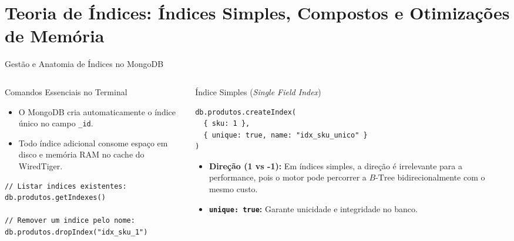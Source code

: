 \section[Índices Simples, Compostos e Otimizações]{Teoria de Índices: Índices Simples, Compostos e Otimizações de Memória}

\begin{frame}[fragile]{Gestão e Anatomia de Índices no MongoDB}
  \vspace{0.05cm}
  \begin{columns}[t]
    \begin{column}{0.48\textwidth}
      \alert{Comandos Essenciais no Terminal}\par
      \scriptsize
      \begin{itemize}
        \item O MongoDB cria automaticamente o índice único no campo \texttt{\_id}.
        \item Todo índice adicional consome espaço em disco e memória RAM no cache do WiredTiger.
      \end{itemize}
      \begin{lstlisting}[language=mongosh]
// Listar indices existentes:
db.produtos.getIndexes()

// Remover um indice pelo nome:
db.produtos.dropIndex("idx_sku_1")
      \end{lstlisting}
    \end{column}
    \begin{column}{0.48\textwidth}
      \alert{Índice Simples (\textit{Single Field Index})}\par
      \scriptsize
      \begin{lstlisting}[language=mongosh]
db.produtos.createIndex(
  { sku: 1 },
  { unique: true, name: "idx_sku_unico" }
)
      \end{lstlisting}
      \begin{itemize}
        \item \textbf{Direção (1 vs -1):} Em índices simples, a direção é irrelevante para a performance, pois o motor pode percorrer a $B\text{-Tree}$ bidirecionalmente com o mesmo custo.
        \item \textbf{\texttt{unique: true}:} Garante unicidade e integridade no banco.
      \end{itemize}
    \end{column}
  \end{columns}
\end{frame}

